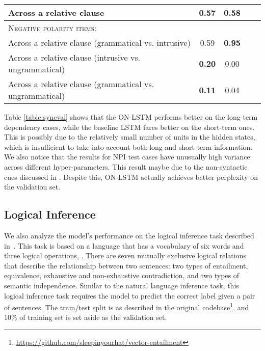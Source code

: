 \documentclass{article} \usepackage{iclr2019_conference,times}
\begin{document}
\begin{table*}[t]
{\begin{tabular}{l c c c c}
Across a relative clause                        & 0.57 & \bf 0.58  \\
\midrule
\textsc{Negative polarity items:}\vspace{0.2em}\\
Across a relative clause (grammatical vs. intrusive)    & 0.59 & \bf 0.95  \\
Across a relative clause (intrusive vs. ungrammatical)    & \bf 0.20 & 0.00  \\
Across a relative clause (grammatical vs. ungrammatical)    & \bf 0.11 & 0.04  \\
\bottomrule
\end{tabular}
}
\caption{Overall accuracy for the ON-LSTM and LSTM on each test case. ``Long-term dependency'' means that an unrelated phrase (or a clause) exist between the targeted pair of words, while ``short-term dependency'' means there is no such distraction.}
\label{table:syneval}
\end{table*}

Table \ref{table:syneval} shows that the ON-LSTM performs better on the long-term dependency cases, while the baseline LSTM fares better on the short-term ones.
This is possibly due to the relatively small number of units in the hidden states, which is insufficient to take into account both long and short-term information.
We also notice that the results for NPI test cases have unusually high variance across different hyper-parameters.
This result maybe due to the non-syntactic cues discussed in \citet{marvin2018targeted}.
Despite this, ON-LSTM actually achieves better perplexity on the validation set.

\subsection{Logical Inference}
We also analyze the model's performance on the logical inference task described in~\citet{bowman2015tree}. 
This task is based on a language that has a vocabulary of six words and three logical operations, . 
There are seven mutually exclusive logical relations that describe the relationship between two sentences: two types of entailment, equivalence, exhaustive and non-exhaustive contradiction, and two types of semantic independence. 
Similar to the natural language inference task, this logical inference task requires the model to predict the correct label given a pair of sentences.
The train/test split is as described in the original codebase\footnote{\url{https://github.com/sleepinyourhat/vector-entailment}}, and 10\% of training set is set aside as the validation set. 
\end{document}
